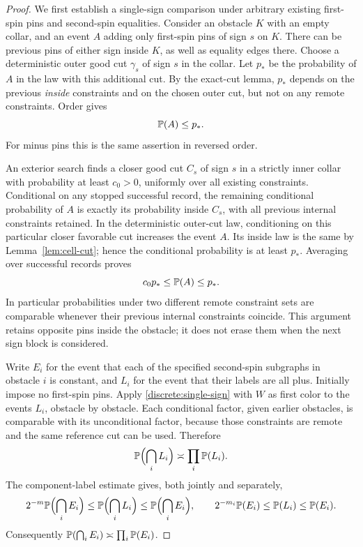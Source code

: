 \begin{proof}
We first establish a single-sign comparison under arbitrary existing
first-spin pins and second-spin equalities. Consider an obstacle $K$
with an empty collar, and an event $A$ adding only first-spin pins of
sign $s$ on $K$. There can be previous pins of either sign inside $K$,
as well as equality edges there. Choose a deterministic outer good cut
$\gamma_s$ of sign $s$ in the collar. Let $p_*$ be the probability of
$A$ in the law with this additional cut. By the exact-cut lemma, $p_*$
depends on the previous \emph{inside} constraints and on the chosen
outer cut, but not on any remote constraints. Order gives
\begin{equation}\label{discrete:pstar}
 \mathbb P(A)\le p_*.
\end{equation}
For minus pins this is the same assertion in reversed order.

An exterior search finds a closer good cut $C_s$ of sign $s$ in a
strictly inner collar with probability at least $c_0>0$, uniformly over
all existing constraints. Conditional on any stopped successful record,
the remaining conditional probability of $A$ is exactly its probability
inside $C_s$, with all previous internal constraints retained. In the
deterministic outer-cut law, conditioning on this particular closer
favorable cut increases the event $A$. Its inside law is the same by
Lemma~\ref{lem:cell-cut}; hence the conditional probability is at least
$p_*$. Averaging over successful records proves
\begin{equation}\label{discrete:single-sign}
 c_0p_*\le\mathbb P(A)\le p_*.
\end{equation}
In particular probabilities under two different remote constraint sets
are comparable whenever their previous internal constraints coincide.
This argument retains opposite pins inside the obstacle; it does not
erase them when the next sign block is considered.

Write $E_i$ for the event that each of the specified second-spin
subgraphs in obstacle $i$ is constant, and $L_i$ for the event that their
labels are all plus. Initially impose no first-spin pins. Apply
\eqref{discrete:single-sign} with $W$ as first color to the events $L_i$,
obstacle by obstacle. Each conditional factor, given earlier obstacles,
is comparable with its unconditional factor, because those constraints
are remote and the same reference cut can be used. Therefore
\[
 \mathbb P\Bigl(\bigcap_i L_i\Bigr)\asymp\prod_i\mathbb P(L_i).
\]
The component-label estimate gives, both jointly and separately,
\[
 2^{-m}\mathbb P\Bigl(\bigcap_i E_i\Bigr)
 \le\mathbb P\Bigl(\bigcap_i L_i\Bigr)
 \le\mathbb P\Bigl(\bigcap_i E_i\Bigr),\qquad
 2^{-m_i}\mathbb P(E_i)\le\mathbb P(L_i)\le\mathbb P(E_i).
\]
Consequently $\mathbb P(\bigcap_iE_i)\asymp\prod_i\mathbb P(E_i)$.


\end{proof}
